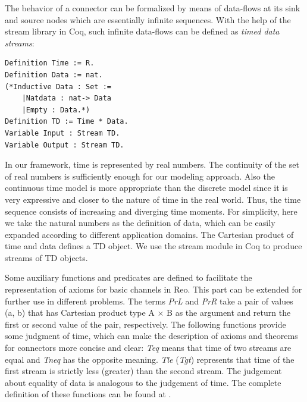\documentclass[preprint,3p]{elsarticle}
\begin{document}
The behavior of a connector can be formalized by means of data-flows at its sink and source nodes which are essentially infinite sequences. With the help of the stream library in Coq, such infinite data-flows can be defined as \emph{timed data streams}:
\begin{lstlisting}[language=coq]
Definition Time := R.
Definition Data := nat.
(*Inductive Data : Set :=
    |Natdata : nat-> Data
    |Empty : Data.*)
Definition TD := Time * Data.
Variable Input : Stream TD.
Variable Output : Stream TD.
\end{lstlisting}
%
In our framework, time is represented by real numbers. %
The continuity of the set of real numbers is sufficiently enough for our modeling approach. Also the
continuous time model is more appropriate than the discrete model since it is very expressive and closer to the nature of time in the real world. Thus, the time sequence consists of increasing and diverging time moments. For simplicity, here we take the natural numbers as the definition of data, which can be easily expanded according to different application domains. The Cartesian product of time and data defines a TD object.
We use the stream module in Coq to produce streams of TD objects.

Some auxiliary functions and predicates are defined to facilitate the representation of axioms for basic channels in Reo. This part can be extended for further use in different problems.
The terms \emph{PrL} and \emph{PrR} take a pair of values (a, b) that has Cartesian product type A $\times$ B as the argument and return the first or second value of the pair, respectively.
The following functions provide some judgment of time, which can make
the description of axioms and theorems for connectors more concise and
clear: \emph{Teq} means that time of two streams are equal and \emph{Tneq} has the
opposite meaning. \emph{Tle}  (\emph{Tgt}) represents that time of the first stream is
strictly less (greater) than the second stream. The judgement about
equality of data is analogous to the judgement of time. The complete
definition of these functions can be found at \cite{reo2coq2Z3}.
\end{document}
